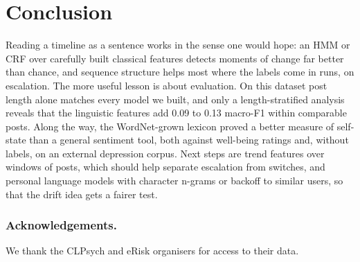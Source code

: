 \documentclass[runningheads]{llncs}
\begin{document}
\section{Conclusion}

Reading a timeline as a sentence works in the sense one would hope: an HMM or CRF over carefully built classical features detects moments of change far better than chance, and sequence structure helps most where the labels come in runs, on escalation. The more useful lesson is about evaluation. On this dataset post length alone matches every model we built, and only a length-stratified analysis reveals that the linguistic features add 0.09 to 0.13 macro-F1 within comparable posts. Along the way, the WordNet-grown lexicon proved a better measure of self-state than a general sentiment tool, both against well-being ratings and, without labels, on an external depression corpus. Next steps are trend features over windows of posts, which should help separate escalation from switches, and personal language models with character n-grams or backoff to similar users, so that the drift idea gets a fairer test.

\subsubsection*{Acknowledgements.}
We thank the CLPsych and eRisk organisers for access to their data.



\end{document}
